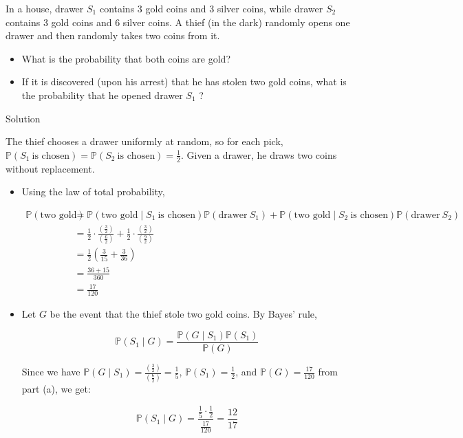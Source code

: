 \documentclass{qlnotes-export}
\begin{document}
In a house, drawer \(S_{1}\) contains 3 gold coins and 3 silver coins, while drawer \(S_{2}\) contains 3 gold coins and 6 silver coins. A thief (in the dark) randomly opens one drawer and then randomly takes two coins from it.

\begin{itemize}
\item
  What is the probability that both coins are gold?
\item
  If it is discovered (upon his arrest) that he has stolen two gold coins, what is the probability that he opened drawer \(S_{1}\) ?
\end{itemize}

\begin{qlsolution}{Solution}

The thief chooses a drawer uniformly at random, so for each pick, \({\mathbb{P}}(S_{1}\ \text{is chosen}) = {\mathbb{P}}(S_{2}\ \text{is chosen}) = \frac{1}{2}\). Given a drawer, he draws two coins without replacement.

\begin{itemize}
\item
  Using the law of total probability,

  \[\begin{matrix}
  {{\mathbb{P}}(\text{two gold})} & {= {\mathbb{P}}(\text{two gold} \mid S_{1}\ \text{is chosen}){\mathbb{P}}(\text{drawer}\ S_{1}) + {\mathbb{P}}(\text{two gold} \mid S_{2}\ \text{is chosen}){\mathbb{P}}(\text{drawer}\ S_{2})} \\
   & {= \frac{1}{2} \cdot \frac{\left( \frac{3}{2} \right)}{\left( \frac{6}{2} \right)} + \frac{1}{2} \cdot \frac{\left( \frac{3}{2} \right)}{\left( \frac{9}{2} \right)}} \\
   & {= \frac{1}{2}\left( {\frac{3}{15} + \frac{3}{36}} \right)} \\
   & {= \frac{36 + 15}{360}} \\
   & {= \frac{17}{120}}
  \end{matrix}\]
\item
  Let \(G\) be the event that the thief stole two gold coins. By Bayes' rule,

  \[{\mathbb{P}}(S_{1} \mid G) = \frac{{\mathbb{P}}(G \mid S_{1}){\mathbb{P}}(S_{1})}{{\mathbb{P}}(G)}\]

  Since we have \({\mathbb{P}}(G \mid S_{1}) = \frac{\left( \frac{3}{2} \right)}{\left( \frac{6}{2} \right)} = \frac{1}{5}\), \({\mathbb{P}}(S_{1}) = \frac{1}{2}\), and \({\mathbb{P}}(G) = \frac{17}{120}\) from part (a), we get:

  \[{\mathbb{P}}(S_{1} \mid G) = \frac{\frac{1}{5} \cdot \frac{1}{2}}{\frac{17}{120}} = \frac{12}{17}\]
\end{itemize}

\end{qlsolution}
\end{document}
